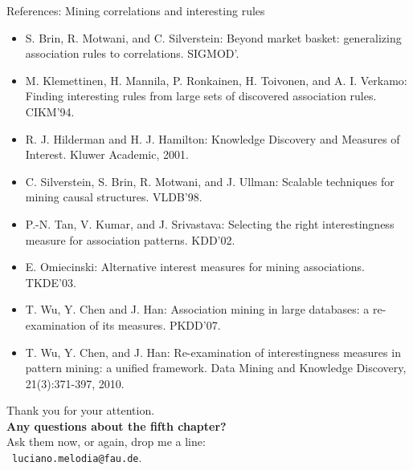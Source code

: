 \documentclass[aspectratio=169,t]{beamer}
\begin{document}
  {
    \begin{frame}{References: Mining correlations and interesting rules}
    \begin{itemize}
      \item S. Brin, R. Motwani, and C. Silverstein: Beyond market basket: generalizing association rules to correlations. SIGMOD'.
      \item M. Klemettinen, H. Mannila, P. Ronkainen, H. Toivonen, and A. I. Verkamo: Finding interesting rules from large sets of discovered association rules.  CIKM'94.
      \item R. J. Hilderman and H. J. Hamilton: Knowledge Discovery and Measures of Interest. Kluwer Academic, 2001.
      \item C. Silverstein, S. Brin, R. Motwani, and J. Ullman: Scalable techniques for mining causal structures. VLDB'98.
      \item P.-N. Tan, V. Kumar, and J. Srivastava: Selecting the right interestingness measure for association patterns. KDD'02.
      \item E. Omiecinski: Alternative interest measures for mining associations. TKDE'03.
      \item T. Wu, Y. Chen and J. Han: Association mining in large databases: a re-examination of its measures. PKDD'07.
      \item T. Wu, Y. Chen, and J. Han: Re-examination of interestingness measures in pattern mining: a unified framework. Data Mining and Knowledge Discovery, 21(3):371-397, 2010.
    \end{itemize}
    \end{frame}
  }

  { %
    \begin{frame}[c]
      \begin{center}
        Thank you for your attention.\\
        {\bf Any questions about the fifth chapter?}\\[0.5cm]
        Ask them now, or again, drop me a line: \\ 
        \faSendO \ \texttt{luciano.melodia@fau.de}.
      \end{center}
    \end{frame}
  }
\end{document}
